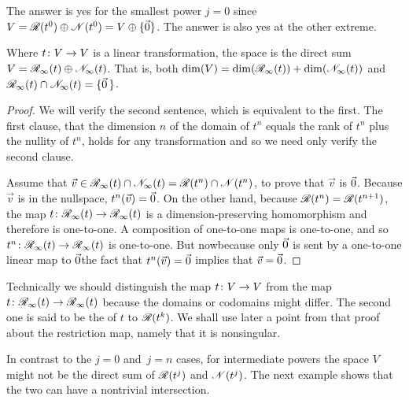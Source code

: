 The answer is yes for the smallest power $j=0$ since
\( V=\mathscr{R}(t^0)\oplus\mathscr{N}(t^0)=V\oplus\mbox{$\{\vec{0}\}$} \).
The answer is also yes at the other extreme.

\begin{lemma} \label{GenRngNullDirSumToSp}
Where \( \mbox{$t\colon V\to V$} \) is a linear transformation, 
the space is the direct sum 
\( V=\mathscr{R}_\infty(t)\oplus\mathscr{N}_\infty(t) \).
That is, both \( \dim(V)=\dim(\mathscr{R}_\infty(t))+\dim(\mathscr{N}_\infty(t)) \) and
\( \mathscr{R}_\infty(t)\cap\mathscr{N}_\infty(t)=\mbox{$\{\vec{0}\,\}$} \).
\end{lemma}

\begin{proof}
We will verify the second sentence, which is equivalent to the first.
The first clause, that the dimension $n$ of the domain of $t^n$ equals
the rank of $t^n$ plus the nullity of $t^n$, holds for any transformation and
so we need only verify the second clause.

Assume that
\( \vec{v}\in\mathscr{R}_\infty(t)\cap\mathscr{N}_\infty(t)
              =\mathscr{R}(t^n)\cap\mathscr{N}(t^n) \),
to prove that $\vec{v}$ is \( \vec{0} \).
Because \( \vec{v} \) is in the nullspace, \( t^n(\vec{v})=\vec{0} \).
On the other hand, because \( \mathscr{R}(t^n)=\mathscr{R}(t^{n+1}) \),
the map \( \mbox{$t\colon \mathscr{R}_\infty(t)\to \mathscr{R}_\infty(t)$} \) is
a dimension-preserving homomorphism and therefore is one-to-one.
A composition of one-to-one maps is one-to-one, and so
\( \mbox{$t^n\colon \mathscr{R}_\infty(t)\to \mathscr{R}_\infty(t)$} \) is one-to-one.
But now\Dash because only \( \vec{0} \) is sent by a one-to-one linear map to
\( \vec{0} \)\Dash the fact that \( t^n(\vec{v})=\vec{0} \) implies that
\( \vec{v}=\vec{0} \).
\end{proof}

\begin{note} \label{note:RestONeToOne}
Technically we should distinguish the map $\mbox{$t\colon V\to V$}$ from
the map \( \mbox{$t\colon \mathscr{R}_\infty(t)\to \mathscr{R}_\infty(t)$} \) 
because the domains or codomains might differ.
The second one is said to be the 
of $t$ to 
$\mathscr{R}(t^k)$. 
We shall use later a point from that proof about the restriction map, 
namely that it is nonsingular.
\end{note}

In contrast to the $j=0$ and~$j=n$ cases, for intermediate powers 
the space $V$ might not be the direct sum of
$\mathscr{R}(t^j)$ and $\mathscr{N}(t^j)$.
The next example shows that the two can have a nontrivial intersection.

